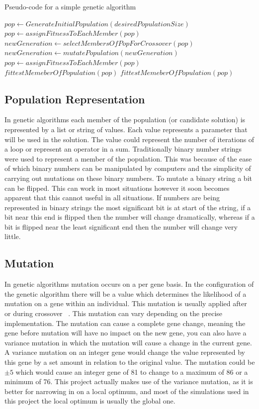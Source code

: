 \documentclass[12pt]{article}
\begin{document}
\begin{algorithm}
\caption{Pseudo-code for a simple genetic algorithm}
\label{fig:garun}
\begin{algorithmic}
\State $pop \gets GenerateInitialPopulation(desiredPopulationSize)$
\State $pop \gets assignFitnessToEachMember(pop)$
	\State $newGeneration \gets selectMembersOfPopForCrossover(pop)$
	\State $newGeneration \gets mutatePopulation(newGeneration)$
	\State $pop \gets assignFitnessToEachMember(pop)$
		\State \Return $fittestMemeberOfPopulation(pop)$
	\EndIf
\EndWhile
\State \Return $fittestMemeberOfPopulation(pop)$

\end{algorithmic}
\end{algorithm}

\subsection{Population Representation}
In genetic algorithms each member of the population (or candidate solution) is represented by a list or string of values.
Each value represents a parameter that will be used in the solution.
The value could represent the number of iterations of a loop or represent an operator in a sum.
Traditionally binary number strings were used to represent a member of the population.
This was because of the ease of which binary numbers can be manipulated by computers and the simplicity of carrying out mutations on these binary numbers.
To mutate a binary string a bit can be flipped.
This can work in most situations however it soon becomes apparent that this cannot useful in all situations.
If numbers are being represented in binary strings the most significant bit is at start of the string, if a bit near this end is flipped 
then the number will change dramatically, whereas if a bit is flipped near the least significant end then the number will change very little.


\subsection{Mutation}
In genetic algorithms mutation occurs on a per gene basis. In the configuration of the genetic algorithm there will be a value which 
determines the likelihood of a mutation on a gene within an individual. This mutation is usually applied after or during crossover ~\cite{goldberg1989genetic}.
This mutation can vary depending on the precise implementation. The mutation can cause a complete gene change, meaning the gene before mutation will
have no impact on the new gene, you can also have a variance mutation in which the mutation will cause a change in the current gene. A variance
mutation on an integer gene would change the value represented by this gene by a set amount in relation to the original value. The mutation could be \(\pm5\)
which would cause an integer gene of 81 to change to a maximum of 86 or a minimum of 76. This project actually makes use of the variance mutation, as it is 
better for narrowing in on a local optimum, and most of the simulations used in this project the local optimum is usually the global one.
\end{document}
